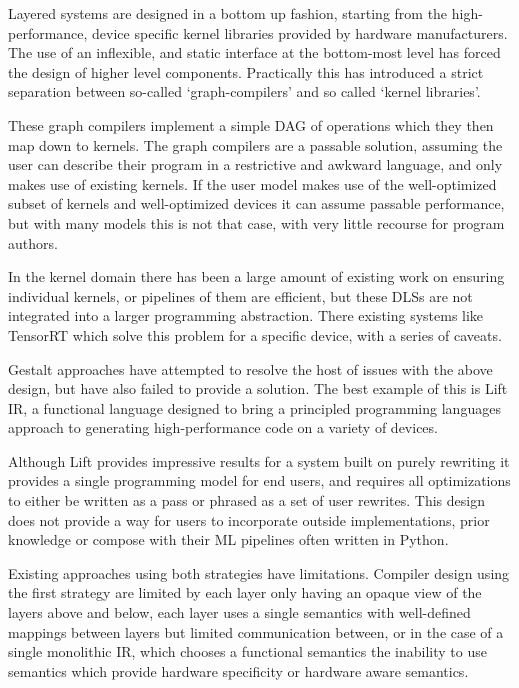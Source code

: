 Layered systems are designed in a bottom up fashion, starting from the high-performance, device specific kernel libraries provided by hardware manufacturers. The use of an inflexible, and static interface at the bottom-most level has forced the design of higher level components. Practically this has introduced a strict separation between so-called ‘graph-compilers’ and so called ‘kernel libraries’.

These graph compilers implement a simple DAG of operations which they then map down to kernels. The graph compilers are a passable solution, assuming the user can describe their program in a restrictive and awkward language, and only makes use of existing kernels. If the user model makes use of the well-optimized subset of kernels and well-optimized devices it can assume passable performance, but with many models this is not that case, with very little recourse for program authors.

In the kernel domain there has been a large amount of existing work on ensuring individual kernels, or pipelines of them are efficient, but these DLSs are not integrated into a larger programming abstraction. There existing systems like TensorRT which solve this problem for a specific device, with a series of caveats.

Gestalt approaches have attempted to resolve the host of issues with the above design, but have also failed to provide a solution. The best example of this is Lift IR, a functional language designed to bring a principled programming languages approach to generating high-performance code on a variety of devices.

Although Lift provides impressive results for a system built on purely rewriting it provides a single programming model for end users, and requires all optimizations to either be written as a pass or phrased as a set of user rewrites. This design does not provide a way for users to incorporate outside implementations, prior knowledge or compose with their ML pipelines often written in Python.

Existing approaches using both strategies have limitations. Compiler design using the first strategy are limited by each layer only having an opaque view of the layers above and below, each layer uses a single semantics with well-defined mappings between layers but limited communication between, or in the case of a single monolithic IR, which chooses a functional semantics the inability to use semantics which provide hardware specificity or hardware aware semantics.


